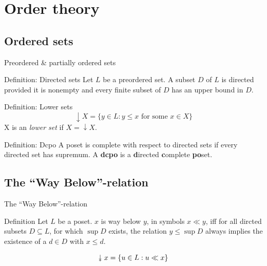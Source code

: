 \documentclass{beamer}
\newcommand{\downdownarrow}{\mathrel{\reflectbox{\rotatebox[origin=c]{90}{$\twoheadleftarrow$}}}}
\begin{document}
\section{Order theory}
\subsection{Ordered sets}
\begin{frame}{Preordered \& partially ordered sets}
\begin{block}{Definition: Directed sets}
Let $L$ be a preordered set. A subset $D$ of $L$ is directed provided it is nonempty and every finite subset of $D$ has an upper bound in $D$.
\end{block}
\begin{block}{Definition: Lower sets}
$$\downarrow X = \{y \in L: y \leq x \text{ for some } x \in X \}$$
X is an \emph{lower set} if $X = \downarrow X$.
\end{block}

\begin{block}{Definition: Dcpo}
A poset is complete with respect to directed sets if every directed set has supremum. A \textbf{dcpo} is a \textbf{d}irected \textbf{c}omplete \textbf{po}set.
\end{block}
\end{frame}
\subsection{The ``Way Below''-relation}

\begin{frame}{The ``Way Below''-relation}


\begin{block}{Definition}
Let $L$ be a poset. $x$ is way below $y$, in symbols $x \ll y$, iff for all dircted subsets $D \subseteq L$, for which $\sup D$ exists, the relation $y \leq \sup D$ always implies the existence of a $d \in D$ with $x \leq d$.
\end{block}

\begin{block}{}
$$\downdownarrow x = \{u \in L: u \ll x\}$$
\end{block}
\end{frame}
\end{document}
